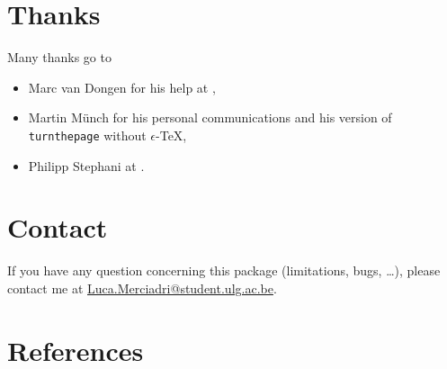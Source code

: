 \documentclass[10pt,a4paper,final,makeidx,twosides]{article}
\newcommand{\etex}{$\epsilon$-\TeX}
\begin{document}
\section{Thanks}
Many thanks go to
\begin{itemize}
\item Marc van Dongen for his help at \cite{mvd1},
\item Martin M\"unch for his personal communications and his version of \verb|turnthepage| without \etex,
\item Philipp Stephani at \cite{ps}.
\end{itemize}

\section{Contact}
If you have any question concerning this package (limitations, bugs, \ldots), please contact me at \href{mailto:Luca.Merciadri@student.ulg.ac.be}{Luca.Merciadri@student.ulg.ac.be}.

\newpage

\printindex
% 
\newpage
\section{References}
\nocite{*}

%
%
\label{biblio}

\end{document}
